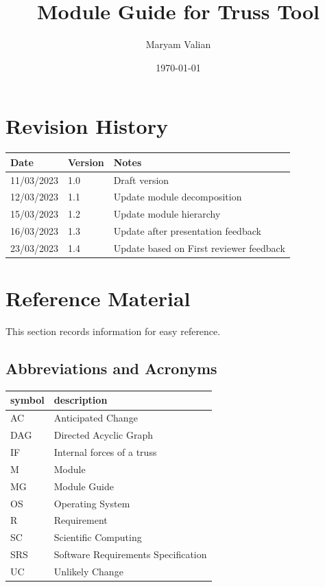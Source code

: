 \documentclass[12pt, titlepage]{article}
\begin{document}
\title{Module Guide for Truss Tool} 
\author{Maryam Valian}
\date{\today}

\maketitle


\section{Revision History}

\begin{tabularx}{\textwidth}{p{3cm}p{2cm}X}
\toprule {\bf Date} & {\bf Version} & {\bf Notes}\\
\midrule
11/03/2023 & 1.0 & Draft version\\
12/03/2023 & 1.1 & Update module decomposition\\
15/03/2023 &1.2 & Update module hierarchy\\
16/03/2023 &1.3 & Update after presentation feedback\\
23/03/2023 &1.4 & Update based on First reviewer feedback\\
\bottomrule
\end{tabularx}

\newpage

\section{Reference Material}

This section records information for easy reference.

\subsection{Abbreviations and Acronyms}

\renewcommand{\arraystretch}{1.2}
\begin{tabular}{l l} 
  \toprule		
  \textbf{symbol} & \textbf{description}\\
  \midrule 
  AC & Anticipated Change\\
  DAG & Directed Acyclic Graph \\
  IF & Internal forces of a truss\\
  M & Module \\
  MG & Module Guide \\
  OS & Operating System \\
  R & Requirement\\
  SC & Scientific Computing \\
  SRS & Software Requirements Specification\\
  
  UC & Unlikely Change \\
  
  \bottomrule
\end{tabular}\\
\end{document}
